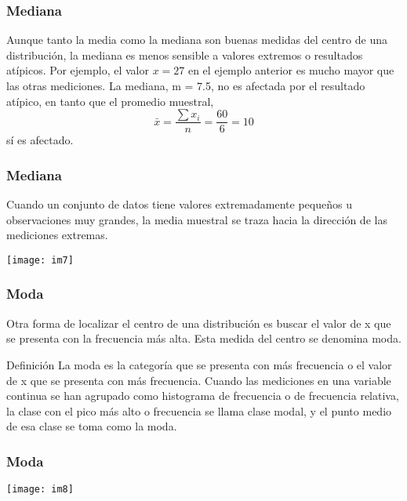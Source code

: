 \documentclass[spanish]{beamer}
\begin{document}
\begin{frame}
\frametitle{Mediana}
Aunque tanto la media como la mediana son buenas medidas del centro de una distribución, la mediana es menos sensible a valores extremos o resultados atípicos. Por ejemplo, el valor $x =27$ en el ejemplo anterior es mucho mayor que las otras mediciones. La mediana, m = 7.5, no es afectada por el resultado atípico, en tanto que el promedio muestral,
\begin{equation*}
\bar{x}=\frac{\sum{x_{i}}}{n}=\frac{60}{6}=10
\end{equation*}
sí es afectado.
\end{frame}
\begin{frame}
\frametitle{Mediana}
Cuando un conjunto de datos tiene valores extremadamente pequeños u observaciones muy grandes, la media muestral se traza hacia la dirección de las mediciones extremas.


\begin{center}
\texttt{[image: im7]}
\end{center}

\end{frame}
\begin{frame}
\frametitle{Moda}
Otra forma de localizar el centro de una distribución es buscar el valor de x que se presenta con la frecuencia más alta. Esta medida del centro se denomina moda.

\begin{block}{Definición}
La moda es la categoría que se presenta con más frecuencia o el valor
de x que se presenta con más frecuencia. Cuando las mediciones en una variable continua se han agrupado como histograma de frecuencia o de frecuencia relativa, la clase con el pico más alto o frecuencia se llama clase modal, y el punto medio de esa clase se toma como la moda.
\end{block}
\end{frame}
\begin{frame}
\frametitle{Moda}
\begin{center}
\texttt{[image: im8]}
\end{center}
\end{frame}
\end{document}
